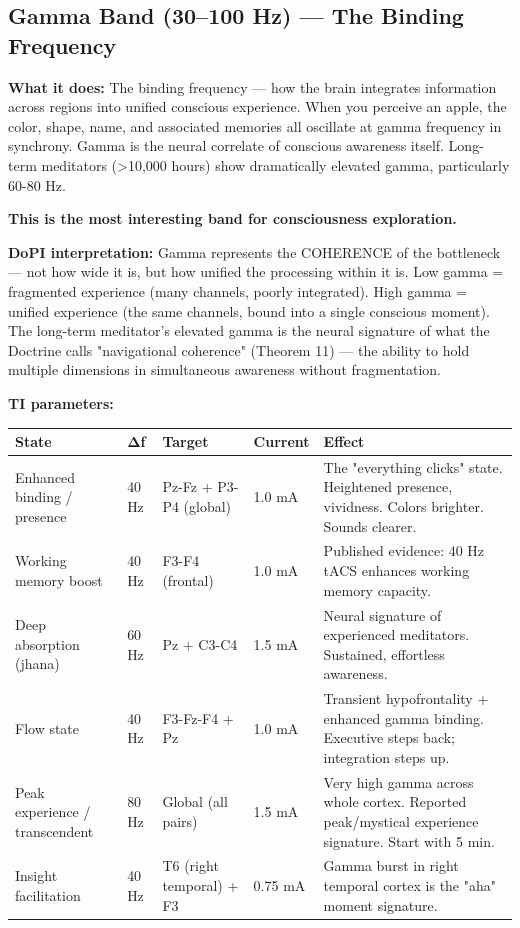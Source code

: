 \bigskip\noindent\makebox[\textwidth]{\color{rulegray}\rule{5cm}{0.3pt}}\bigskip


\subsection*{Gamma Band (30–100 Hz) — The Binding Frequency}


\textbf{What it does:} The binding frequency — how the brain integrates information across regions into unified conscious experience. When you perceive an apple, the color, shape, name, and associated memories all oscillate at gamma frequency in synchrony. Gamma is the neural correlate of conscious awareness itself. Long-term meditators (>10,000 hours) show dramatically elevated gamma, particularly 60-80 Hz.


\textbf{This is the most interesting band for consciousness exploration.}


\textbf{DoPI interpretation:} Gamma represents the COHERENCE of the bottleneck — not how wide it is, but how unified the processing within it is. Low gamma = fragmented experience (many channels, poorly integrated). High gamma = unified experience (the same channels, bound into a single conscious moment). The long-term meditator's elevated gamma is the neural signature of what the Doctrine calls "navigational coherence" (Theorem 11) — the ability to hold multiple dimensions in simultaneous awareness without fragmentation.


\textbf{TI parameters:}



\begin{longtable}{p{} p{} p{} p{} p{}}
\toprule
\textbf{State} & \textbf{Δf} & \textbf{Target} & \textbf{Current} & \textbf{Effect} \\
\midrule
\endhead
Enhanced binding / presence & 40 Hz & Pz-Fz + P3-P4 (global) & 1.0 mA & The "everything clicks" state. Heightened presence, vividness. Colors brighter. Sounds clearer. \\
Working memory boost & 40 Hz & F3-F4 (frontal) & 1.0 mA & Published evidence: 40 Hz tACS enhances working memory capacity. \\
Deep absorption (jhana) & 60 Hz & Pz + C3-C4 & 1.5 mA & Neural signature of experienced meditators. Sustained, effortless awareness. \\
Flow state & 40 Hz & F3-Fz-F4 + Pz & 1.0 mA & Transient hypofrontality + enhanced gamma binding. Executive steps back; integration steps up. \\
Peak experience / transcendent & 80 Hz & Global (all pairs) & 1.5 mA & Very high gamma across whole cortex. Reported peak/mystical experience signature. Start with 5 min. \\
Insight facilitation & 40 Hz & T6 (right temporal) + F3 & 0.75 mA & Gamma burst in right temporal cortex is the "aha" moment signature. \\
\bottomrule
\end{longtable}



